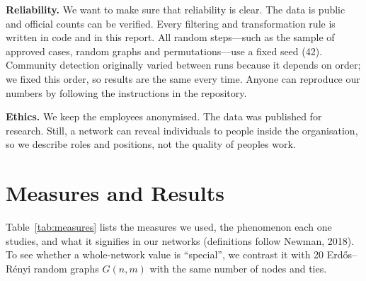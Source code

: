 \documentclass[12pt, a4paper]{article}
\begin{document}
\textbf{Reliability.} We want to make sure that reliability is clear. The data is public and official counts can be verified. Every filtering and transformation rule is written in code and in this report. All random steps---such as the sample of approved cases, random graphs and permutations---use a fixed seed (42). Community detection originally varied between runs because it depends on order; we fixed this order, so results are the same every time. Anyone can reproduce our numbers by following the instructions in the repository.

\textbf{Ethics.} We keep the employees anonymised. The data was published for research. Still, a network can reveal individuals to people inside the organisation, so we describe roles and positions, not the quality of peoples work.

\section{Measures and Results}
\label{measures}

Table~\ref{tab:measures} lists the measures we used, the phenomenon each one studies, and what it signifies in our networks (definitions follow Newman, 2018). To see whether a whole-network value is ``special'', we contrast it with 20 Erd\H{o}s--R\'enyi random graphs $G(n, m)$ with the same number of nodes and ties.
\end{document}
